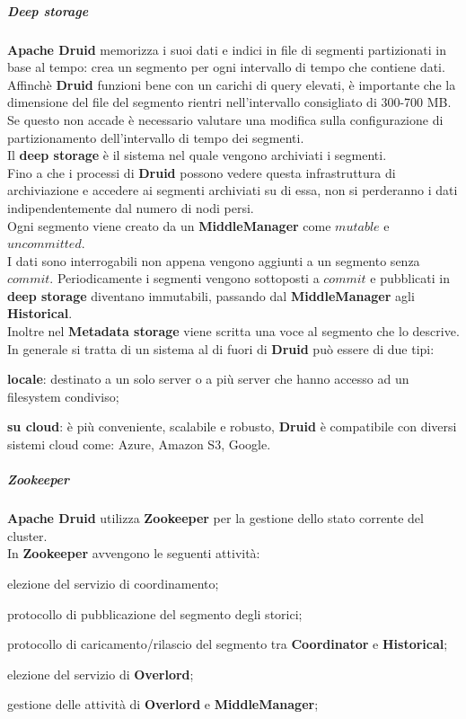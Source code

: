 \subparagraph{Deep storage}\label{sec:deep_storage}
\textbf{Apache Druid} memorizza i suoi dati e indici in file di segmenti partizionati in base al
tempo:  crea un segmento per ogni intervallo di tempo che contiene dati.\\
Affinchè \textbf{Druid} funzioni bene con un carichi di query elevati, è importante che la dimensione del file
del segmento rientri nell’intervallo consigliato di 300-700 MB. Se questo non accade è necessario valutare 
una modifica sulla configurazione di partizionamento dell’intervallo di tempo dei segmenti.\\
Il \textbf{deep storage} è il sistema nel quale vengono archiviati i segmenti.\\
Fino a che i processi di \textbf{Druid} possono vedere questa infrastruttura di archiviazione e accedere
ai segmenti archiviati su di essa, non si perderanno i dati indipendentemente dal numero
di nodi persi.\\
Ogni segmento viene creato da un \textbf{MiddleManager} come $mutable$ e $uncommitted$. \\
I dati sono interrogabili non appena vengono aggiunti a un segmento senza $commit$.
Periodicamente i segmenti vengono sottoposti a $commit$ e pubblicati in \textbf{deep storage} diventano immutabili, passando dal \textbf{MiddleManager} agli \textbf{Historical}.
\\Inoltre nel \textbf{Metadata storage} viene scritta una voce al segmento che lo descrive.\\
In generale si tratta di un sistema al di fuori di \textbf{Druid} può essere di due tipi:
\begin{list}{*}
\item 
\textbf{locale}: destinato a un solo server o a più server che hanno accesso ad un filesystem
condiviso;
\item \item \textbf{su cloud}: è più conveniente, scalabile e robusto, \textbf{Druid} è compatibile con diversi sistemi cloud come: Azure,
Amazon S3, Google.
\end{list}
\subparagraph{Zookeeper}
\textbf{Apache Druid} utilizza \textbf{Zookeeper} per la gestione dello stato corrente del cluster.\\
In \textbf{Zookeeper} avvengono le seguenti attività:
\begin{list}{*}
    \item elezione del servizio di coordinamento;
    \item protocollo di pubblicazione del segmento degli storici;
    \item protocollo di caricamento/rilascio del segmento tra \textbf{Coordinator} e \textbf{Historical};
    \item elezione del servizio di \textbf{Overlord};
    \item gestione delle attività di \textbf{Overlord} e \textbf{MiddleManager};
\end{list}
